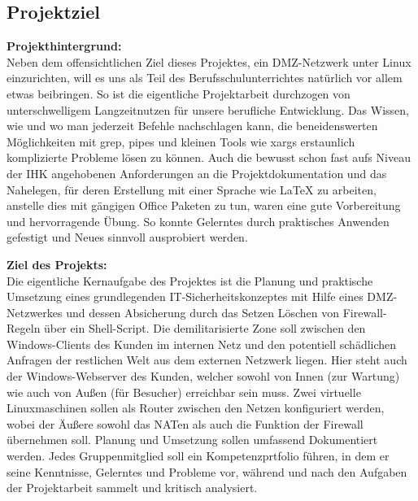 \subsection{Projektziel} 
\label{sec:Projektziel}
    \textbf{Projekthintergrund:}\\
    Neben dem offensichtlichen Ziel dieses Projektes, ein DMZ-Netzwerk unter Linux einzurichten, will es uns als Teil des Berufsschulunterrichtes natürlich vor allem etwas beibringen. So ist die eigentliche Projektarbeit durchzogen von unterschwelligem Langzeitnutzen für unsere berufliche Entwicklung. Das Wissen, wie und wo man jederzeit Befehle nachschlagen kann, die beneidenswerten Möglichkeiten mit grep, pipes und kleinen Tools wie xargs erstaunlich komplizierte Probleme lösen zu können. Auch die bewusst schon fast aufs Niveau der IHK angehobenen Anforderungen an die Projektdokumentation und das Nahelegen, für deren Erstellung mit einer Sprache wie \LaTeX{} zu arbeiten, anstelle dies mit gängigen Office Paketen zu tun, waren eine gute Vorbereitung und hervorragende Übung. So konnte Gelerntes durch praktisches Anwenden gefestigt und Neues sinnvoll ausprobiert werden.
    
    \textbf{Ziel des Projekts:}\\
    Die eigentliche Kernaufgabe des Projektes ist die Planung und praktische Umsetzung eines grundlegenden IT-Sicherheitskonzeptes mit Hilfe eines DMZ-Netzwerkes und dessen Absicherung durch das Setzen \bzw Löschen von Firewall-Regeln über ein Shell-Script. Die demilitarisierte Zone soll zwischen den Windows-Clients des Kunden im internen Netz und den potentiell schädlichen Anfragen der restlichen Welt aus dem externen Netzwerk liegen. Hier steht auch der Windows-Webserver des Kunden, welcher sowohl von Innen (zur Wartung) wie auch von Außen (für Besucher) erreichbar sein muss. Zwei virtuelle Linuxmaschinen sollen als Router zwischen den Netzen konfiguriert werden, wobei der Äußere sowohl das NATen als auch die Funktion der Firewall übernehmen soll. Planung und Umsetzung sollen umfassend Dokumentiert werden. Jedes Gruppenmitglied soll ein Kompetenzprtfolio führen, in dem er seine Kenntnisse, Gelerntes und Probleme vor, während und nach den Aufgaben der Projektarbeit sammelt und kritisch analysiert.

